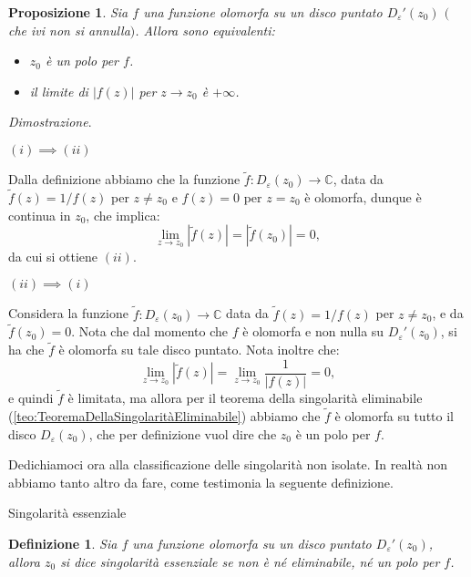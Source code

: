 \documentclass[11pt]{book}
\makeatletter
\theoremstyle{Definizione}
\newtheorem*{mydef}{Definizione}
\theoremstyle{TeoremaProposizioneLemmaCorollarioCongettura}
\newtheorem{mypropo}[myteo]{Proposizione}
\theoremstyle{OsservazioneNotaEsempio}
\renewenvironment{proof}[1][\proofname]{\par
  \normalfont \topsep6\p@\@plus6\p@\relax
  \trivlist
  \item[\hskip\labelsep
        \itshape
    #1\@addpunct{.}]\ignorespaces
}{%
  \endtrivlist\@endpefalse
}
\renewenvironment{proof}{\textsl{Dimostrazione}.}{}
\newcommand{\C}{\mathbb{C}}
\newcommand{\Disc}[3][]{D^{#1}_{{#2}}({#3})}
\newcommand{\DiscPunt}[2]{D_{#1}'({#2})}
\makeatother
\begin{document}
\begin{boxpro}
\begin{mypropo}
Sia $f$ una funzione olomorfa su un disco puntato $\DiscPunt{\varepsilon}{z_0}$ $($che ivi non si annulla$)$. Allora sono equivalenti:
\begin{itemize}
\item[$(i)$] $z_0$ è un polo per $f$.
\item[$(ii)$] il limite di $|f(z)|$ per $z \to z_0$ è $+\infty$.
\end{itemize}
\end{mypropo}
\tcblower
\begin{proof}
\hfill
\begin{flushleft}
$(i) \implies (ii)$
\end{flushleft}
Dalla definizione abbiamo che la funzione $\widetilde{f}:\Disc{\varepsilon}{z_0} \longrightarrow \C$, data da $\widetilde{f}(z) = 1/f(z)$ per $z \neq z_0$ e $f(z) = 0$ per $z = z_0$ è olomorfa, dunque è continua in $z_0$, che implica:
$$
\lim_{z \to z_0} |\widetilde{f}(z)| = |\widetilde{f}(z_0)| = 0,
$$
da cui si ottiene $(ii)$.
\begin{flushleft}
$(ii) \implies (i)$
\end{flushleft}
Considera la funzione $\widetilde{f}:\Disc{\varepsilon}{z_0} \longrightarrow \C$ data da $\widetilde{f}(z) = 1/f(z)$ per $z \neq z_0$, e da $\widetilde{f}(z_0) = 0$. Nota che dal momento che $f$ è olomorfa e non nulla su $\DiscPunt{\varepsilon}{z_0}$, si ha che $\widetilde{f}$ è olomorfa su tale disco puntato. Nota inoltre che:
$$
\lim_{z \to z_0} |\widetilde{f}(z)| = \lim_{z \to z_0} \frac{1}{|f(z)|} = 0,
$$
e quindi $\widetilde{f}$ è limitata, ma allora per il teorema della singolarità eliminabile (\ref{teo:TeoremaDellaSingolaritàEliminabile}) abbiamo che $\widetilde{f}$ è olomorfa su tutto il disco $\Disc{\varepsilon}{z_0}$, che per definizione vuol dire che $z_0$ è un polo per $f$.
\end{proof}
\end{boxpro}
\noindent
Dedichiamoci ora alla classificazione delle singolarità non isolate. In realtà non abbiamo tanto altro da fare, come testimonia la seguente definizione.
\begin{boxdef}{Singolarità essenziale}
\begin{mydef}
Sia $f$ una funzione olomorfa su un disco puntato $\DiscPunt{\varepsilon}{z_0}$, allora $z_0$ si dice singolarità essenziale se non è né eliminabile, né un polo per $f$.
\end{mydef}
\end{boxdef}
\end{document}
